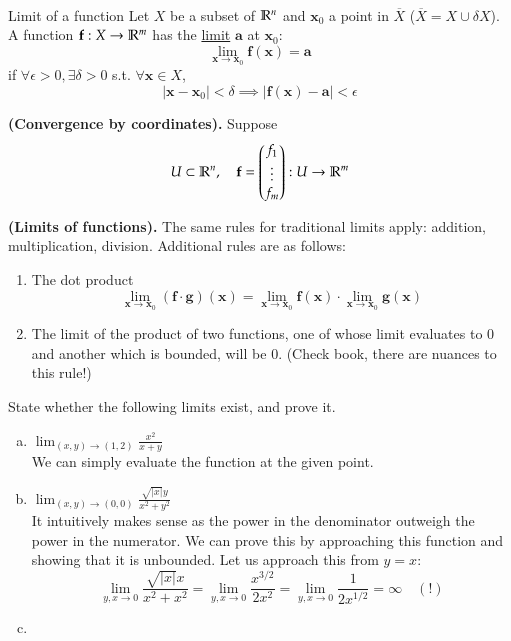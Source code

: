 \\

\begin{defn}{Limit of a function}
Let $X$ be a subset of $\mathbb{R}^n$ and $\bm{x}_0$ a point in $\overline{X}$ ($\overline{X}=X\cup \delta X$). A function $\textbf{f} : X \rightarrow \mathbb{R}^m$ has the \ul{limit}
 $\bm{a}$ at $\bm{x}_0$:
\[\lim_{\bm{x}\rightarrow \bm{x}_0}\bm{f}(\bm{x}) = \bm{a}\]
if $\forall \epsilon > 0, \exists\delta > 0$ s.t. $\forall\bm{x}\in X$,
\[|\bm{x}-\bm{x}_0|<\delta \implies |\bm{f}(\bm{x})-\bm{a}|<\epsilon\]
\end{defn}

\begin{proposition}
\textbf{(Convergence by coordinates).} Suppose
\[U\subset \mathbb{R}^n, \quad \textbf{f}=\begin{pmatrix} f_1 \\ \vdots \\ f_m \end{pmatrix}: U\rightarrow \mathbb{R}^m\]
\end{proposition}

\begin{theorem}
  \textbf{(Limits of functions).} The same rules for traditional limits apply: addition, multiplication, division. Additional rules are as follows:
  \begin{enumerate}
    \item The dot product
    \[\lim_{\bm{x}\to\bm{x}_0}(\bm{f} \cdot \bm{g})(\bm{x})=\lim_{\bm{x}\to\bm{x}_0}\bm{f}(\bm{x})\cdot \lim_{\bm{x}\to\bm{x}_0}\bm{g}(\bm{x})\]
    \item The limit of the product of two functions, one of whose limit evaluates to $0$ and another which is bounded, will be $0$. (Check book, there are nuances to this rule!)
  \end{enumerate}
\end{theorem}

 State whether the following limits exist, and prove it.
\begin{enumerate}[a.]
  \item $\displaystyle \lim_{(x,y)\rightarrow (1,2)} \frac{x^2}{x+y}$\\
   We can simply evaluate the function at the given point. 
  
  \item $\displaystyle \lim_{(x,y)\rightarrow (0,0)} \frac{\sqrt{|x|}y}{x^2+y^2}$\\
   It intuitively makes sense as the power in the denominator outweigh the power in the numerator. We can prove this by approaching this function and showing that it is unbounded. Let us approach this from $y=x$: 
  \[\lim_{y,x\to 0}\frac{\sqrt{|x|}x}{x^2+x^2}=\lim_{y,x\to 0}\frac{x^{3/2}}{2x^2}=\lim_{y,x\to 0}\frac{1}{2x^{1/2}}=\infty\quad (!)\]
  \item 

\end{enumerate}
